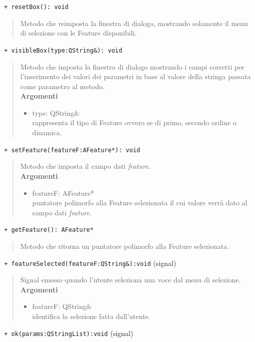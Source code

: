 \color{blue}\verb! + resetBox(): void!
\begin{quote}
\color{black} Metodo che reimposta la finestra di dialogo, mostrando solamente il menu di selezione con le Feature{} disponibili.
\end{quote}
\color{blue}\verb! + visibleBox(type:QString&): void!
\color{black}
\begin{quote} Metodo che imposta la finestra di dialogo mostrando i campi corretti per l'inserimento dei valori dei parametri in base al valore della stringa passata come parametro al metodo.\\
\textbf{Argomenti}
\begin{itemize}
\item type: QString\& \\ rappresenta il tipo di Feature\g{} ovvero se di primo, secondo ordine o dinamica.
\end{itemize}
\end{quote}
\color{blue}\verb! + setFeature(featureF:AFeature*): void!
\color{black}
\begin{quote} Metodo che imposta il campo dati \emph{feature}.\\
\textbf{Argomenti}
\begin{itemize}
\item featureF: AFeature* \\ puntatore polimorfo alla Feature\g{} selezionata il cui valore verrà dato al campo dati \emph{feature}.
\end{itemize}
\end{quote}
\color{blue}\verb! + getFeature(): AFeature*!
\color{black}
\begin{quote} Metodo che ritorna un puntatore polimorfo alla Feature\g{} selezionata.\\
\end{quote}
\color{blue}\verb! + featureSelected(featureF:QString&):void! (signal)
\color{black} 
\begin{quote}
Signal\g{} emesso quando l'utente seleziona una voce dal menu di selezione.
\\ \textbf{Argomenti}
\begin{itemize}
\item featureF: QString\& \\ identifica la selezione fatta dall'utente.
\end{itemize}
\end{quote}
\color{blue}\verb! + ok(params:QStringList):void! (signal)
\color{black} 
